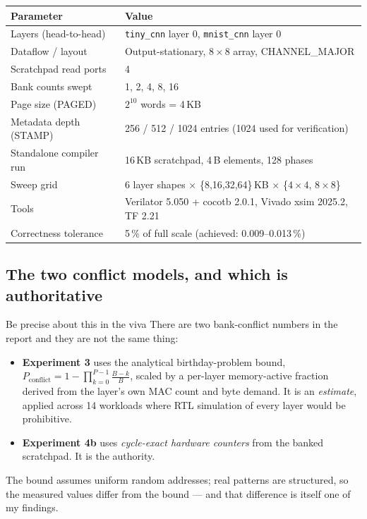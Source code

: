 \documentclass[11pt,a4paper]{article}
\newcommand{\file}[1]{\texttt{\small #1}}
\begin{document}
\begin{center}
\small
\begin{tabular}{@{}ll@{}}
\toprule
\textbf{Parameter} & \textbf{Value} \\
\midrule
Layers (head-to-head)   & \file{tiny\_cnn} layer 0, \file{mnist\_cnn} layer 0 \\
Dataflow / layout       & Output-stationary, $8\times8$ array, CHANNEL\_MAJOR \\
Scratchpad read ports   & 4 \\
Bank counts swept       & 1, 2, 4, 8, 16 \\
Page size (PAGED)       & $2^{10}$ words = 4\,KB \\
Metadata depth (STAMP)  & 256 / 512 / 1024 entries (1024 used for verification) \\
Standalone compiler run & 16\,KB scratchpad, 4\,B elements, 128 phases \\
Sweep grid              & 6 layer shapes $\times$ \{8,16,32,64\}\,KB $\times$ \{$4\times4$, $8\times8$\} \\
Tools                   & Verilator 5.050 + cocotb 2.0.1, Vivado xsim 2025.2, TF 2.21 \\
Correctness tolerance   & 5\,\% of full scale (achieved: 0.009--0.013\,\%) \\
\bottomrule
\end{tabular}
\end{center}

\subsection{The two conflict models, and which is authoritative}

\begin{warnbox}{Be precise about this in the viva}
There are two bank-conflict numbers in the report and they are not the same
thing:
\begin{itemize}[leftmargin=1.3em,itemsep=2pt]
  \item \textbf{Experiment 3} uses the analytical birthday-problem bound,
        $P_{\text{conflict}} = 1 - \prod_{k=0}^{P-1}\frac{B-k}{B}$, scaled by a
        per-layer memory-active fraction derived from the layer's own MAC count
        and byte demand. It is an \emph{estimate}, applied across 14 workloads
        where RTL simulation of every layer would be prohibitive.
  \item \textbf{Experiment 4b} uses \emph{cycle-exact hardware counters} from
        the banked scratchpad. It is the authority.
\end{itemize}
The bound assumes uniform random addresses; real patterns are structured, so
the measured values differ from the bound --- and that difference is itself one
of my findings.
\end{warnbox}
\end{document}
